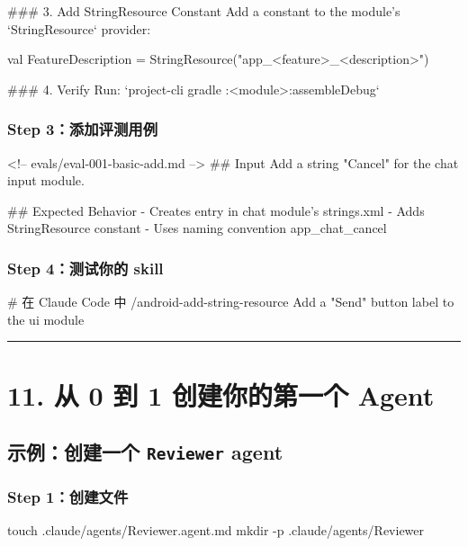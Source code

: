 \begin{codeblock}

### 3. Add StringResource Constant
Add a constant to the module's `StringResource` provider:
\end{codeblock}
val FeatureDescription = StringResource("app\_<feature>\_<description>")

\begin{codeblock}

### 4. Verify
Run: `project-cli gradle :<module>:assembleDebug`
\end{codeblock}

\subsubsection{Step 3：添加评测用例}

\begin{codeblock}
<!-- evals/eval-001-basic-add.md -->
## Input
Add a string "Cancel" for the chat input module.

## Expected Behavior
- Creates entry in chat module's strings.xml
- Adds StringResource constant
- Uses naming convention app_chat_cancel
\end{codeblock}

\subsubsection{Step 4：测试你的 skill}

\begin{codeblock}
# 在 Claude Code 中
/android-add-string-resource Add a "Send" button label to the ui module
\end{codeblock}

\bigskip\hrule\bigskip

\section{11. 从 0 到 1 创建你的第一个 Agent}

\subsection{示例：创建一个 \texttt{Reviewer} agent}

\subsubsection{Step 1：创建文件}

\begin{codeblock}
touch .claude/agents/Reviewer.agent.md
mkdir -p .claude/agents/Reviewer
\end{codeblock}

